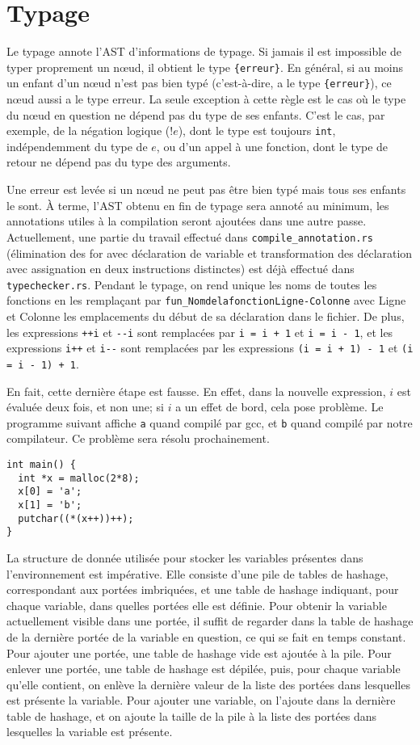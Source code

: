 \documentclass{scrartcl}
\begin{document}
\section*{Typage}
Le typage annote l'AST d'informations de typage. Si jamais il est impossible
de typer proprement un n\oe{}ud, il obtient le type \verb|{erreur}|. En général,
si au moins un enfant d'un n\oe{}ud n'est pas bien typé (c'est-à-dire, a le type
\verb|{erreur}|), ce n\oe{}ud aussi a le type erreur. La seule exception à cette règle
est le cas où le type du n\oe{}ud en question ne dépend pas du type de ses enfants.
C'est le cas, par exemple, de la négation logique ($!e$), dont le type est
toujours \verb|int|, indépendemment du type de $e$, ou d'un appel à une fonction,
dont le type de retour ne dépend pas du type des arguments.\par
Une erreur est levée si un n\oe{}ud ne peut pas être bien typé mais tous ses enfants
le sont. À terme, l'AST obtenu en fin de typage sera annoté au minimum, les annotations
utiles à la compilation seront ajoutées dans une autre passe. Actuellement, une partie
du travail effectué dans \verb|compile_annotation.rs| (élimination des for avec déclaration de
variable et transformation des déclaration avec assignation en deux instructions distinctes)
est déjà effectué dans \verb|typechecker.rs|. Pendant le typage, on rend unique les noms de toutes
les fonctions en les remplaçant par \verb|fun_NomdelafonctionLigne-Colonne| avec Ligne et Colonne les
emplacements du début de sa déclaration dans le fichier. De plus, les expressions \verb|++i| et \verb|--i|
sont remplacées par \verb|i = i + 1| et \verb|i = i - 1|, et les expressions \verb|i++| et \verb|i--| sont remplacées
par les expressions \verb|(i = i + 1) - 1| et \verb|(i = i - 1) + 1|.\par
En fait, cette dernière étape est fausse. En effet, dans la nouvelle expression,
\(i\) est évaluée deux fois, et non une; si \(i\) a un effet de bord, cela pose
problème. Le programme suivant affiche \verb|a| quand compilé par gcc, et
\verb|b| quand compilé par notre compilateur. Ce problème sera résolu
prochainement.
\begin{verbatim}
int main() {
  int *x = malloc(2*8);
  x[0] = 'a';
  x[1] = 'b';
  putchar((*(x++))++);
}
\end{verbatim}\par
La structure de donnée utilisée pour stocker les variables présentes dans
l'environnement est impérative. Elle consiste d'une pile de tables de hashage,
correspondant aux portées imbriquées, et une table de hashage indiquant, pour
chaque variable, dans quelles portées elle est définie. Pour obtenir la
variable actuellement visible dans une portée, il suffit de regarder dans la
table de hashage de la dernière portée de la variable en question, ce qui se
fait en temps constant. Pour ajouter une portée, une table de hashage vide est
ajoutée à la pile. Pour enlever une portée, une table de hashage est dépilée,
puis, pour chaque variable qu'elle contient, on enlève la dernière valeur
de la liste des portées dans lesquelles est présente la variable. Pour ajouter
une variable, on l'ajoute dans la dernière table de hashage, et on ajoute la
taille de la pile à la liste des portées dans lesquelles la variable est présente.
\end{document}

